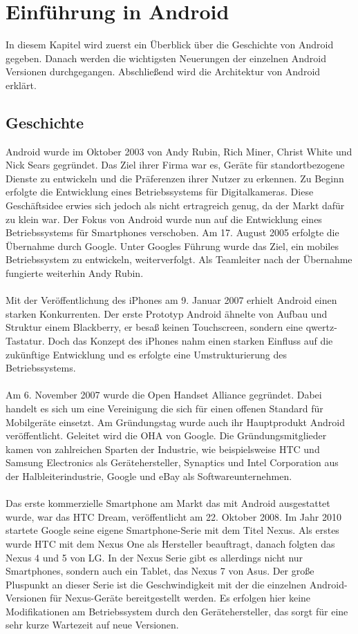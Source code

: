 \chapter [Einführung in Android] {Einführung in Android}
\label{chap:Überblick}

In diesem Kapitel wird zuerst ein Überblick über die Geschichte von Android gegeben. Danach werden die wichtigsten Neuerungen der einzelnen Android Versionen durchgegangen. Abschließend wird die Architektur von Android erklärt.

\section{Geschichte}
Android wurde im Oktober 2003 von Andy Rubin, Rich Miner, Christ White und Nick Sears gegründet. Das Ziel ihrer Firma war es, Geräte für standortbezogene Dienste zu entwickeln und die Präferenzen ihrer Nutzer zu erkennen. Zu Beginn erfolgte die Entwicklung eines Betriebssystems für Digitalkameras. Diese Geschäftsidee erwies sich jedoch als nicht ertragreich genug, da der Markt dafür zu klein war. Der Fokus von Android wurde nun auf die Entwicklung eines Betriebssystems für Smartphones verschoben. Am 17. August 2005 erfolgte die Übernahme durch Google. Unter Googles Führung wurde das Ziel, ein mobiles Betriebssystem zu entwickeln, weiterverfolgt. Als Teamleiter nach der Übernahme fungierte weiterhin Andy Rubin.\cite{1}
\\
\\
Mit der Veröffentlichung des iPhones am 9. Januar 2007 erhielt Android einen starken Konkurrenten. Der erste Prototyp Android ähnelte von Aufbau und Struktur einem Blackberry, er besaß keinen Touchscreen, sondern eine qwertz-Tastatur. Doch das Konzept des iPhones nahm einen starken Einfluss auf die zukünftige Entwicklung und es erfolgte eine Umstrukturierung des Betriebssystems.\cite{2}
\\
\\
Am 6. November 2007 wurde die Open Handset Alliance gegründet. Dabei handelt es sich um eine Vereinigung die sich für einen offenen Standard für Mobilgeräte einsetzt. Am Gründungstag wurde auch ihr Hauptprodukt Android veröffentlicht. Geleitet wird die OHA von Google. Die Gründungsmitglieder kamen von zahlreichen Sparten der Industrie, wie beispielsweise HTC und Samsung Electronics als Gerätehersteller, Synaptics und Intel Corporation aus der Halbleiterindustrie, Google und eBay als Softwareunternehmen.\cite{3}
\\
\\
Das erste kommerzielle Smartphone am Markt das mit Android ausgestattet wurde, war das HTC Dream, veröffentlicht am 22. Oktober 2008. Im Jahr 2010 startete Google seine eigene Smartphone-Serie mit dem Titel Nexus. Als erstes wurde HTC mit dem Nexus One als Hersteller beauftragt, danach folgten das Nexus 4 und 5 von LG. In der Nexus Serie gibt es allerdings nicht nur Smartphones, sondern auch ein Tablet, das Nexus 7 von Asus. Der große Pluspunkt an dieser Serie ist die Geschwindigkeit mit der die einzelnen Android-Versionen für Nexus-Geräte bereitgestellt werden. Es erfolgen hier keine Modifikationen am Betriebssystem durch den Gerätehersteller, das sorgt für eine sehr kurze Wartezeit auf neue Versionen.\cite{4}\cite{5}

